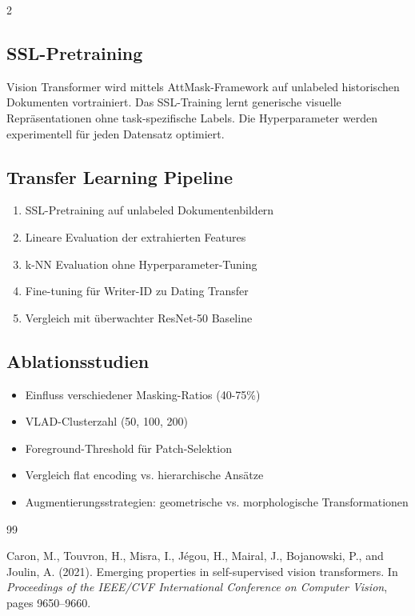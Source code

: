\documentclass[12pt,a4paper]{article}
\begin{document}
\begin{multicols}{2}
\subsection{SSL-Pretraining}

Vision Transformer wird mittels AttMask-Framework auf unlabeled historischen Dokumenten vortrainiert. Das SSL-Training lernt generische visuelle Repräsentationen ohne task-spezifische Labels. Die Hyperparameter werden experimentell für jeden Datensatz optimiert.

\subsection{Transfer Learning Pipeline}

\begin{enumerate}
\item SSL-Pretraining auf unlabeled Dokumentenbildern
\item Lineare Evaluation der extrahierten Features
\item k-NN Evaluation ohne Hyperparameter-Tuning
\item Fine-tuning für Writer-ID zu Dating Transfer
\item Vergleich mit überwachter ResNet-50 Baseline
\end{enumerate}

\subsection{Ablationsstudien}

\begin{itemize}
\item Einfluss verschiedener Masking-Ratios (40-75\%)
\item VLAD-Clusterzahl (50, 100, 200)
\item Foreground-Threshold für Patch-Selektion
\item Vergleich flat encoding vs. hierarchische Ansätze
\item Augmentierungsstrategien: geometrische vs. morphologische Transformationen
\end{itemize}



\begin{thebibliography}{99}

Caron, M., Touvron, H., Misra, I., J{\'e}gou, H., Mairal, J., Bojanowski, P., and Joulin, A. (2021).
\newblock Emerging properties in self-supervised vision transformers.
\newblock In \textit{Proceedings of the IEEE/CVF International Conference on Computer Vision}, pages 9650--9660.


\end{thebibliography}
\end{multicols}
\end{document}
